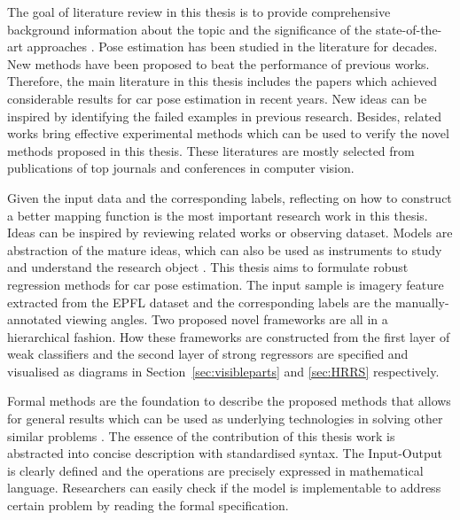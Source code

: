 \documentclass{tutmscthesis}[2010/09/22]
\numberwithin{equation}{section}
\numberwithin{table}{section}
\numberwithin{figure}{section}
\begin{document}
\vspace{0.1cm}  The goal of literature review in this thesis is to provide comprehensive background information about the topic and the significance of the state-of-the-art approaches \cite{cronin2008undertaking}. 
Pose estimation has been studied in the literature for decades.
New methods have been proposed to beat the performance of previous works.
Therefore, the main literature in this thesis includes  the papers which achieved considerable results for car pose estimation in recent years.
New ideas can be inspired by identifying the failed examples in previous research.
Besides, related works bring effective experimental methods which can be used to verify the novel methods proposed in this thesis. 
These literatures are mostly selected from publications of top journals and conferences in computer vision.

\vspace{0.1cm}  Given the input data and the corresponding labels, reflecting on how to construct a better mapping function is the most important research work in this thesis. 
Ideas can be inspired by reviewing related works or observing dataset.
Models are abstraction of the mature ideas, which can also be used as instruments to study and understand the research object \cite{elio2011computing}. 
This thesis aims to formulate robust regression methods for car pose estimation.
The input sample is imagery feature extracted from the EPFL dataset and the corresponding labels are the manually-annotated viewing angles.
Two proposed novel frameworks are all in a hierarchical fashion.
How these frameworks are constructed from the first layer of weak classifiers and the second layer of strong regressors are specified and visualised as diagrams in Section~\ref{sec:visibleparts} and \ref{sec:HRRS} respectively.
 

\vspace{0.1cm}  Formal methods are the foundation to describe the proposed methods that allows for general results which can be used as underlying technologies in solving other similar problems \cite{elio2011computing}. 
The essence of the contribution of this thesis work is abstracted into concise description with standardised syntax. 
The Input-Output is clearly defined and the operations are precisely expressed in mathematical language.
Researchers can easily check if the model is implementable to address certain problem by reading the formal specification.
\end{document}

